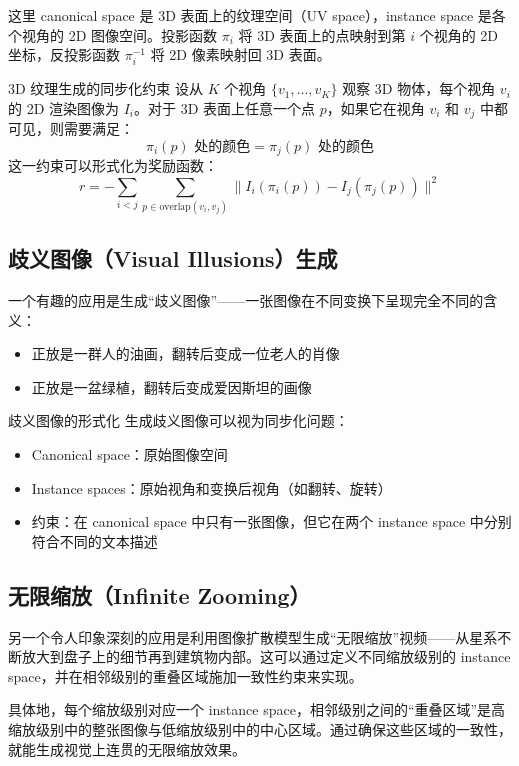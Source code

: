 这里 canonical space 是 3D 表面上的纹理空间（UV space），instance space 是各个视角的 2D 图像空间。投影函数 $\pi_i$ 将 3D 表面上的点映射到第 $i$ 个视角的 2D 坐标，反投影函数 $\pi_i^{-1}$ 将 2D 像素映射回 3D 表面。

\begin{importantbox}{3D 纹理生成的同步化约束}
设从 $K$ 个视角 $\{v_1, \ldots, v_K\}$ 观察 3D 物体，每个视角 $v_i$ 的 2D 渲染图像为 $I_i$。对于 3D 表面上任意一个点 $p$，如果它在视角 $v_i$ 和 $v_j$ 中都可见，则需要满足：
$$\pi_i(p) \text{ 处的颜色} = \pi_j(p) \text{ 处的颜色}$$
这一约束可以形式化为奖励函数：
$$r = -\sum_{i < j} \sum_{p \in \text{overlap}(v_i, v_j)} \| I_i(\pi_i(p)) - I_j(\pi_j(p)) \|^2$$
\end{importantbox}

\subsection{歧义图像（Visual Illusions）生成}

一个有趣的应用是生成``歧义图像''——一张图像在不同变换下呈现完全不同的含义：
\begin{itemize}
    \item 正放是一群人的油画，翻转后变成一位老人的肖像
    \item 正放是一盆绿植，翻转后变成爱因斯坦的画像
\end{itemize}

\begin{knowledgebox}{歧义图像的形式化}
生成歧义图像可以视为同步化问题：
\begin{itemize}
    \item Canonical space：原始图像空间
    \item Instance spaces：原始视角和变换后视角（如翻转、旋转）
    \item 约束：在 canonical space 中只有一张图像，但它在两个 instance space 中分别符合不同的文本描述
\end{itemize}
\end{knowledgebox}

\subsection{无限缩放（Infinite Zooming）}

另一个令人印象深刻的应用是利用图像扩散模型生成``无限缩放''视频——从星系不断放大到盘子上的细节再到建筑物内部。这可以通过定义不同缩放级别的 instance space，并在相邻级别的重叠区域施加一致性约束来实现。

具体地，每个缩放级别对应一个 instance space，相邻级别之间的``重叠区域''是高缩放级别中的整张图像与低缩放级别中的中心区域。通过确保这些区域的一致性，就能生成视觉上连贯的无限缩放效果。

